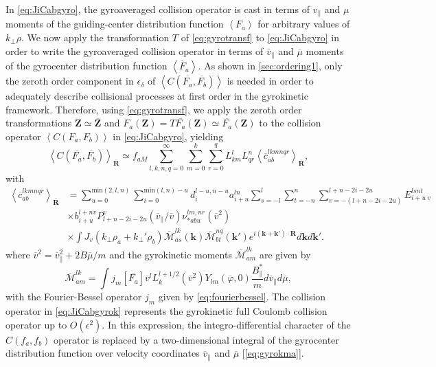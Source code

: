 In \cref{eq:JiCabgyro}, the gyroaveraged collision operator is cast in terms of $v_\parallel$ and $\mu$ moments of the guiding-center distribution function $\left< F_a \right>$ for arbitrary values of $k_\perp \rho$.
%
We now apply the transformation $T$ of \cref{eq:gyrotransf} to \cref{eq:JiCabgyro} in order to write the gyroaveraged collision operator in terms of $\overline v_\parallel$ and $\overline \mu$ moments of the gyrocenter distribution function $\left<\overline  F_a \right>$.
%
As shown in \cref{sec:ordering1}, only the zeroth order component in $\epsilon_\delta$ of $\left<C(\overline{F_a}, \overline{F_b})\right>$ is needed in order to adequately describe collisional processes at first order in the gyrokinetic framework.
%
Therefore, using \cref{eq:gyrotransf}, we apply the zeroth order transformations $\mathbf Z \simeq \overline{\mathbf Z}$ and $F_a(\mathbf Z) = T \overline{F_a}(\mathbf Z) \simeq \overline{F_a}(\mathbf Z)$ to the collision operator $\left< C(F_a,F_b) \right>$ in \cref{eq:JiCabgyro}, yielding
%
\begin{equation}
    \left<C(\overline{F_a},\overline{F_b})\right>_{\overline {\mathbf R}}\simeq f_{aM}\sum_{l,k,n,q=0}^\infty\sum_{m=0}^k\sum_{r=0}^{q}{L_{km}^lL_{qr}^n} \left<\overline c^{lkmnqr}_{ab}\right>_{\overline {\mathbf R}},
    \label{eq:JiCabgyrok}
\end{equation}
%
with
%
\begin{align}
    \left<\overline c^{lkmnqr}_{ab}\right>_{\overline {\mathbf R}}&=\sum_{u=0}^{\text{min}(2,l,n)}\sum_{i=0}^{\text{min}(l,n)-u}d_i^{l-u,n-u}a^{ln}_{i+u}\sum_{s=-l}^l\sum_{t=-n}^n \sum_{v=-(l+n-2i-2u)}^{l+n-2i-2u} E^{ls nt}_{i+u~v}\nonumber\\
    &\times b_{i+u}^{l+n v}P_{l+n-2i-2u}^v(\overline v_\parallel/\overline v){\nu_{*abu}^{lm,nr}(\overline v^2)} \nonumber\\
    &\times \int J_v(k_\perp \rho_a + k_\perp' \rho_b)\overline {\mathcal{M}}^{lk}_{as}(\mathbf k)\overline {\mathcal{M}}^{nq}_{bt}(\mathbf k')e^{i(\mathbf k +\mathbf k')\cdot \overline {\mathbf R}}d \mathbf k d\mathbf k'.
    \label{eq:ccgcgyrok}
\end{align}
%
where $\overline v^2 = \overline v_\parallel^2+2 B \overline \mu/m$ and the gyrokinetic moments $\overline {\mathcal{M}}^{lk}_{am}$ are given by
%
\begin{equation}
    \overline{\mathcal{M}}^{lk}_{am}=\int j_m[\overline{F_a}] \overline v^l L_k^{l+1/2}(\overline v^2) Y_{lm}\left(\overline \varphi,0\right)\frac{B_{\parallel}^*}{m} d \overline v_\parallel d\overline \mu,
\label{eq:gyrokma}
\end{equation}
%
with the Fourier-Bessel operator $j_m$ given by \cref{eq:fourierbessel}.
%
The collision operator in \cref{eq:JiCabgyrok} represents the gyrokinetic full Coulomb collision operator up to $O(\epsilon^2)$.
%
In this expression, the integro-differential character of the $C(f_a,f_b)$ operator is replaced by a two-dimensional integral of the gyrocenter distribution function over velocity coordinates $\overline v_\parallel$ and $\overline \mu$ [\cref{eq:gyrokma}].

